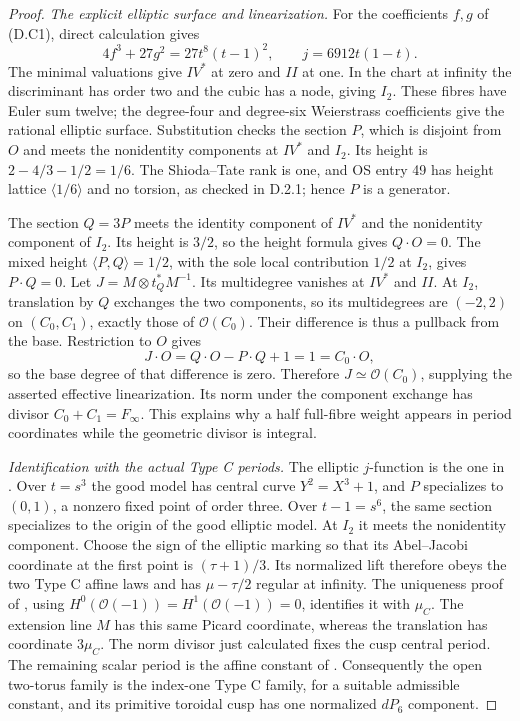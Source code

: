 \begin{proof}
\emph{The explicit elliptic surface and linearization.}
For the coefficients $f,g$ of (D.C1), direct calculation gives
\[
 4f^3+27g^2=27t^8(t-1)^2,\qquad
 j=6912t(1-t).
\]
The minimal valuations give $IV^*$ at zero and $II$ at one.
In the chart at infinity the discriminant has order two and
the cubic has a node, giving $I_2$. These fibres have Euler
sum twelve; the degree-four and degree-six Weierstrass
coefficients give the rational elliptic surface. Substitution
checks the section $P$, which is disjoint from $O$ and meets
the nonidentity components at $IV^*$ and $I_2$.
Its height is $2-4/3-1/2=1/6$. The Shioda--Tate rank is one,
and OS entry 49 has height lattice $\langle1/6\rangle$ and
no torsion, as checked in D.2.1; hence $P$ is a generator.

The section $Q=3P$ meets the identity component of $IV^*$
and the nonidentity component of $I_2$. Its height is $3/2$,
so the height formula gives $Q\cdot O=0$.
The mixed height $\langle P,Q\rangle=1/2$, with the sole
local contribution $1/2$ at $I_2$, gives $P\cdot Q=0$.
Let $J=M\otimes t_Q^*M^{-1}$. Its multidegree vanishes at
$IV^*$ and $II$. At $I_2$, translation by $Q$ exchanges the
two components, so its multidegrees are $(-2,2)$ on
$(C_0,C_1)$, exactly those of $\mathcal O(C_0)$.
Their difference is thus a pullback from the base. Restriction
to $O$ gives
\[
 J\cdot O=Q\cdot O-P\cdot Q+1=1=C_0\cdot O,
\]
so the base degree of that difference is zero. Therefore
$J\simeq\mathcal O(C_0)$, supplying the asserted effective
linearization. Its norm under the component exchange has divisor
$C_0+C_1=F_\infty$. This explains why a half full-fibre weight
appears in period coordinates while the geometric divisor is
integral.

\emph{Identification with the actual Type C periods.}
The elliptic $j$-function is the one in
\cite[Proposition 3.1]{manYang26}. Over $t=s^3$ the good
model has central curve $Y^2=X^3+1$, and $P$ specializes to
$(0,1)$, a nonzero fixed point of order three.
Over $t-1=s^6$, the same section specializes to the origin
of the good elliptic model. At $I_2$ it meets the nonidentity
component. Choose the sign of the elliptic marking so that its
Abel--Jacobi coordinate at the first point is $(\tau+1)/3$.
Its normalized lift therefore obeys the two Type C affine
laws and has $\mu-\tau/2$ regular at infinity.
The uniqueness proof of \cite[Proposition 3.4]{manYang26},
using $H^0(\mathcal O(-1))=H^1(\mathcal O(-1))=0$, identifies
it with $\mu_C$.
The extension line $M$ has this same Picard coordinate,
whereas the translation has coordinate $3\mu_C$.
The norm divisor just calculated fixes the cusp central
period. The remaining scalar period is the affine constant
of \cite[Proposition 3.6]{manYang26}. Consequently the open
two-torus family is the index-one Type C family, for a suitable
admissible constant, and its primitive toroidal cusp has one
normalized $dP_6$ component.


\end{proof}

